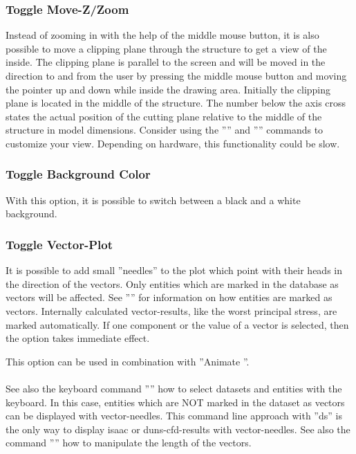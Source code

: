 \documentclass{article}
\begin{document}
\subsubsection{\label{Toggle Move-Z/Zoom}Toggle Move-Z/Zoom}
Instead of zooming in with the help of the middle mouse button, it is also possible to move a clipping plane through the structure to get a view of the inside. The clipping plane is parallel to the screen and will be moved in the direction to and from the user by pressing the middle mouse button and moving the pointer up and down while inside the drawing area. Initially the clipping plane is located in the middle of the structure. The number below the axis cross states the actual position of the cutting plane relative to the middle of the structure in model dimensions. Consider using the '''' and '''' commands to customize your view. Depending on hardware, this functionality could be slow. 

\subsubsection{\label{Toggle Background Color}Toggle Background Color}
With this option, it is possible to switch between a black and a white background.

\subsubsection{\label{Toggle Vector-Plot}Toggle Vector-Plot}
It is possible to add small ''needles'' to the plot which point with their heads in the direction of the vectors. Only entities which are marked in the database as vectors will be affected. See '''' for information on how entities are marked as vectors. Internally calculated vector-results, like the worst principal stress, are marked automatically. If one component or the value of a vector is selected, then the option takes immediate effect.

This option can be used in combination with ''Animate ''.\\\\See also the keyboard command '''' how to select datasets and entities with the keyboard. In this case, entities which are NOT marked in the dataset as vectors can be displayed with vector-needles. This command line approach with ''ds'' is the only way to display isaac or duns-cfd-results with vector-needles. See also the command '''' how to manipulate the length of the vectors.  
\end{document}
